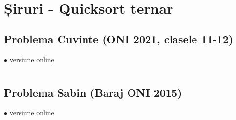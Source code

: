 \documentclass[../main.tex]{subfiles}
\begin{document}
\chapter{Șiruri - Quicksort ternar}

\section{Problema Cuvinte (ONI 2021, clasele 11-12)}
\label{code:cuvinte}
$\bullet$
\href{https://kilonova.ro/submissions/1115444}{versiune online}

\inputminted{cpp}{../src/strings/cuvinte.cpp}

\section{Problema Sabin (Baraj ONI 2015)}
\label{code:sabin}
$\bullet$
\href{https://kilonova.ro/submissions/1115609}{versiune online}

\inputminted{cpp}{../src/strings/sabin.cpp}
\end{document}
